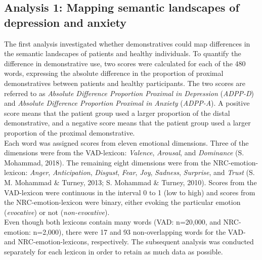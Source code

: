 \documentclass[11pt, a4paper]{article}
\begin{document}
\subsection{Analysis 1: Mapping semantic landscapes of depression and anxiety}
The first analysis investigated whether demonstratives could map differences in the semantic landscapes of patients and healthy individuals. To quantify the difference in demonstrative use, two scores were calculated for each of the 480 words, expressing the absolute difference in the proportion of proximal demonstratives between patients and healthy participants. The two scores are referred to as \textit{Absolute Difference Proportion Proximal in Depression} (\textit{ADPP-D}) and \textit{Absolute Difference Proportion Proximal in Anxiety} (\textit{ADPP-A}). A positive score means that the patient group used a larger proportion of the distal demonstrative, and a negative score means that the patient group used a larger proportion of the proximal demonstrative.\\

Each word was assigned scores from eleven emotional dimensions. Three of the dimensions were from the VAD-lexicon: \textit{Valence}, \textit{Arousal}, and \textit{Dominance} (S. Mohammad, 2018). The remaining eight dimensions were from the NRC-emotion-lexicon: \textit{Anger}, \textit{Anticipation}, \textit{Disgust}, \textit{Fear}, \textit{Joy}, \textit{Sadness}, \textit{Surprise}, and \textit{Trust} (S. M. Mohammad \& Turney, 2013; S. Mohammad \& Turney, 2010). Scores from the VAD-lexicon were continuous in the interval 0 to 1 (low to high) and scores from the NRC-emotion-lexicon were binary, either evoking the particular emotion (\textit{evocative}) or not (\textit{non-evocative}).\\
Even though both lexicons contain many words (VAD: n=20,000, and NRC-emotion: n=2,000), there were 17 and 93 non-overlapping words for the VAD- and NRC-emotion-lexicons, respectively. The subsequent analysis was conducted separately for each lexicon in order to retain as much data as possible.\\ 
\end{document}
